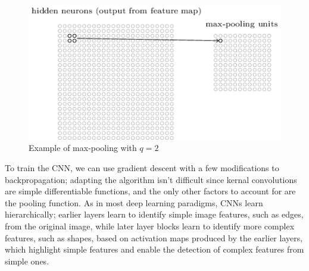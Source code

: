 \documentclass{article}
\begin{document}
\begin{figure}[h]
    \centering
    \includegraphics[scale=0.6]{images/conv_net_pooling.png}
    \caption{Example of max-pooling with $ q = 2 $}
\end{figure}
To train the CNN, we can use gradient descent with a few modifications to backpropagation; adapting the algorithm isn't difficult since kernal convolutions are simple differentiable functions, and the only other factors to account for are the pooling function. As in most deep learning paradigms, CNNs learn hierarchically; earlier layers learn to identify simple image features, such as edges, from the original image, while later layer blocks learn to identify more complex features, such as shapes, based on activation maps produced by the earlier layers, which highlight simple features and enable the detection of complex features from simple ones.
\end{document}

